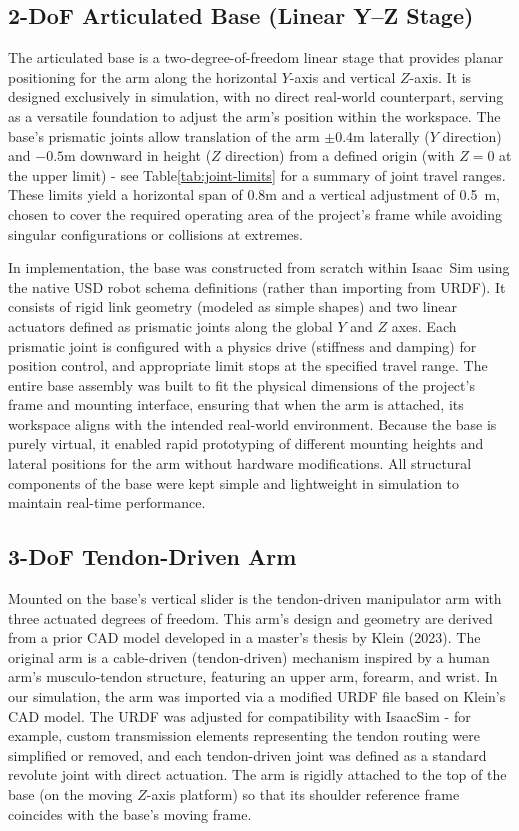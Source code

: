 \subsection{2-\acs{DoF} Articulated Base (Linear Y--Z Stage)}\label{subsec:base}

The articulated base is a two-degree-of-freedom linear stage that provides planar positioning for the arm along the horizontal $Y$-axis and vertical $Z$-axis. It is designed exclusively in simulation, with no direct real-world counterpart, serving as a versatile foundation to adjust the arm's position within the workspace. The base's prismatic joints allow translation of the arm $\pm0.4$m laterally ($Y$ direction) and $-0.5$m downward in height ($Z$ direction) from a defined origin (with $Z=0$ at the upper limit) - see Table\ref{tab:joint-limits} for a summary of joint travel ranges. These limits yield a horizontal span of 0.8m and a vertical adjustment of 0.5~m, chosen to cover the required operating area of the project's frame while avoiding singular configurations or collisions at extremes.

In implementation, the base was constructed from scratch within Isaac~Sim using the native \ac{USD} robot schema definitions (rather than importing from \ac{URDF}). It consists of rigid link geometry (modeled as simple shapes) and two linear actuators defined as prismatic joints along the global $Y$ and $Z$ axes. Each prismatic joint is configured with a physics drive (stiffness and damping) for position control, and appropriate limit stops at the specified travel range. The entire base assembly was built to fit the physical dimensions of the project's frame and mounting interface, ensuring that when the arm is attached, its workspace aligns with the intended real-world environment. Because the base is purely virtual, it enabled rapid prototyping of different mounting heights and lateral positions for the arm without hardware modifications. All structural components of the base were kept simple and lightweight in simulation to maintain real-time performance.

\subsection{3-\acs{DoF} Tendon-Driven Arm}\label{subsec:arm}

Mounted on the base's vertical slider is the tendon-driven manipulator arm with three actuated degrees of freedom. This arm's design and geometry are derived from a prior \ac{CAD} model developed in a master's thesis by Klein (2023)\cite{Klein2023}. The original arm is a cable-driven (tendon-driven) mechanism inspired by a human arm's musculo-tendon structure, featuring an upper arm, forearm, and wrist. In our simulation, the arm was imported via a modified \ac{URDF} file based on Klein's \ac{CAD} model. The \ac{URDF} was adjusted for compatibility with IsaacSim - for example, custom transmission elements representing the tendon routing were simplified or removed, and each tendon-driven joint was defined as a standard revolute joint with direct actuation. The arm is rigidly attached to the top of the base (on the moving $Z$-axis platform) so that its shoulder reference frame coincides with the base's moving frame.


